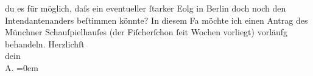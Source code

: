 \begin{ledgroupsized}[t]{13cm}
               du es für möglich, daſs ein eventueller ſtarker Eolg in Berlin doch noch den Intendantenanders beſtimmen könnte? In
               diesem Fa möchte ich einen Antrag des Münchner
                  Schauſpielhauſes (der Fiſcherſchon ſeit
               Wochen vorliegt) vorläufg \label{K_L01581_1v}\label{K_L01581_1h}
               behandeln.\pend
           \pstart
           Herzlichſt{\\[\baselineskip]}dein{\\[\baselineskip]}\spacefill\mbox{A.}\pend
           \leftskip=0em{}
         
         \endnumbering{}\end{ledgroupsized}  \newcommand{\dateiname}{L01581}\newcommand{\titel}{Arthur Schnitzler an Hermann Bahr, 3. 2. 1906}\newcommand{\editorInnen}{ Kurt Ifkovits,  Martin Anton Müller}
      